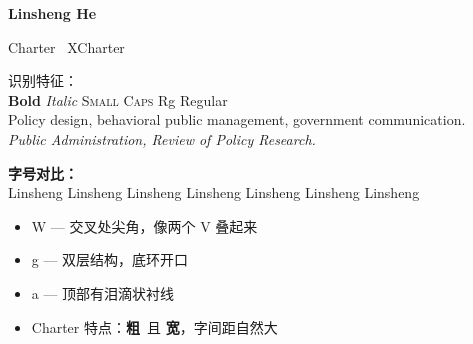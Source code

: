 \documentclass[11pt, a4paper]{article}
\begin{document}
{\fontsize{24pt}{30pt}\selectfont\bfseries Linsheng He}

\vspace{6pt}
{\LARGE Charter \textbullet\ XCharter}

\vspace{12pt}
{\footnotesize 识别特征：}\\[2pt]
{\large \textbf{Bold} \textit{Italic} \textsc{Small Caps} Rg Regular}\\[4pt]
{\large Policy design, behavioral public management, government communication.}\\[4pt]
{\large\itshape Public Administration, Review of Policy Research.}

\vspace{16pt}
{\footnotesize\bfseries 字号对比：}\\[2pt]
{\tiny Linsheng} {\scriptsize Linsheng} {\footnotesize Linsheng} {\small Linsheng}
Linsheng {\large Linsheng} {\Large Linsheng}

\vspace{12pt}
\begin{itemize}
    \item W --- 交叉处尖角，像两个 V 叠起来
    \item g --- 双层结构，底环开口
    \item a --- 顶部有泪滴状衬线
    \item Charter 特点：\textbf{粗}\ 且 \textbf{宽}，字间距自然大
\end{itemize}
\end{document}
